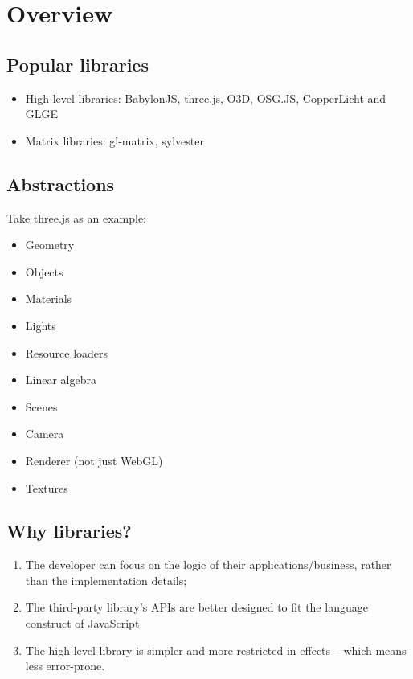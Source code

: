 \section{Overview}\label{overview}

\subsection{Popular libraries}\label{popular-libraries}

\begin{itemize}
\tightlist
\item
  High-level libraries: BabylonJS, three.js, O3D, OSG.JS, CopperLicht
  and GLGE
\item
  Matrix libraries: gl-matrix, sylvester
\end{itemize}

\subsection{Abstractions}\label{abstractions}

Take three.js as an example:

\begin{itemize}
\tightlist
\item
  Geometry
\item
  Objects
\item
  Materials
\item
  Lights
\item
  Resource loaders
\item
  Linear algebra
\item
  Scenes
\item
  Camera
\item
  Renderer (not just WebGL)
\item
  Textures
\end{itemize}

\subsection{Why libraries?}\label{why-libraries}

\begin{enumerate}
\def\labelenumi{\arabic{enumi}.}
\tightlist
\item
  The developer can focus on the logic of their applications/business,
  rather than the implementation details;
\item
  The third-party library's APIs are better designed to fit the language
  construct of JavaScript
\item
  The high-level library is simpler and more restricted in effects --
  which means less error-prone.
\end{enumerate}

